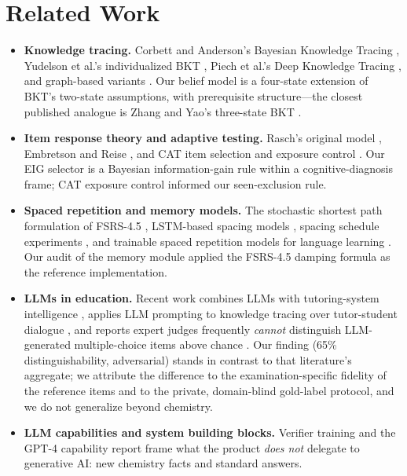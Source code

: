 \section{Related Work}
\label{sec:related}

\begin{itemize}\setlength{\itemsep}{0pt}\setlength{\parskip}{0pt}\setlength{\parsep}{0pt}
\item \textbf{Knowledge tracing.} Corbett and Anderson's Bayesian Knowledge Tracing \cite{corbett1995}, Yudelson et al.'s individualized BKT \cite{yudelson2013}, Piech et al.'s Deep Knowledge Tracing \cite{piech2015}, and graph-based variants \cite{nakagawa2019}. Our belief model is a four-state extension of BKT's two-state assumptions, with prerequisite structure---the closest published analogue is Zhang and Yao's three-state BKT \cite{zhang2018}.
\item \textbf{Item response theory and adaptive testing.} Rasch's original model \cite{rasch1960}, Embretson and Reise \cite{embretson2000}, and CAT item selection and exposure control \cite{vanderlinden1999, eggen2014, sorrel2020, mao2013}. Our EIG selector is a Bayesian information-gain rule within a cognitive-diagnosis frame; CAT exposure control informed our seen-exclusion rule.
\item \textbf{Spaced repetition and memory models.} The stochastic shortest path formulation of FSRS-4.5 \cite{ye2022}, LSTM-based spacing models \cite{pokrywka2023}, spacing schedule experiments \cite{kang2014}, and trainable spaced repetition models for language learning \cite{settles2016}. Our audit of the memory module applied the FSRS-4.5 damping formula as the reference implementation.
\item \textbf{LLMs in education.} Recent work combines LLMs with tutoring-system intelligence \cite{tutorLLM2024}, applies LLM prompting to knowledge tracing over tutor-student dialogue \cite{llmkt2025}, and reports expert judges frequently \emph{cannot} distinguish LLM-generated multiple-choice items above chance \cite{anaquest2025, chatgptqg2025, medicalteacher2025}. Our finding (65\% distinguishability, adversarial) stands in contrast to that literature's aggregate; we attribute the difference to the examination-specific fidelity of the reference items and to the private, domain-blind gold-label protocol, and we do not generalize beyond chemistry.
\item \textbf{LLM capabilities and system building blocks.} Verifier training \cite{cobbe2021} and the GPT-4 capability report \cite{gpt4} frame what the product \emph{does not} delegate to generative AI: new chemistry facts and standard answers.
\end{itemize}
